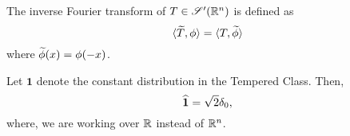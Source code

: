 \begin{definition}
    The inverse Fourier transform of $T\in\mathscr S'(\mathbb{R}^n)$ is defined as 
    \begin{equation*}
        \langle\widetilde{T},\phi\rangle = \langle T, \widetilde{\phi}\rangle
    \end{equation*}
    where $\widetilde{\phi}(x) = \phi(-x)$.
\end{definition}

\begin{example}
    Let $\mathbf 1$ denote the constant distribution in the Tempered Class. Then, 
    \begin{equation*}
        \widehat{\mathbf 1} = \sqrt{2}\delta_0,
    \end{equation*}
    where, we are working over $\mathbb{R}$ instead of $\mathbb{R}^n$.
\end{example}